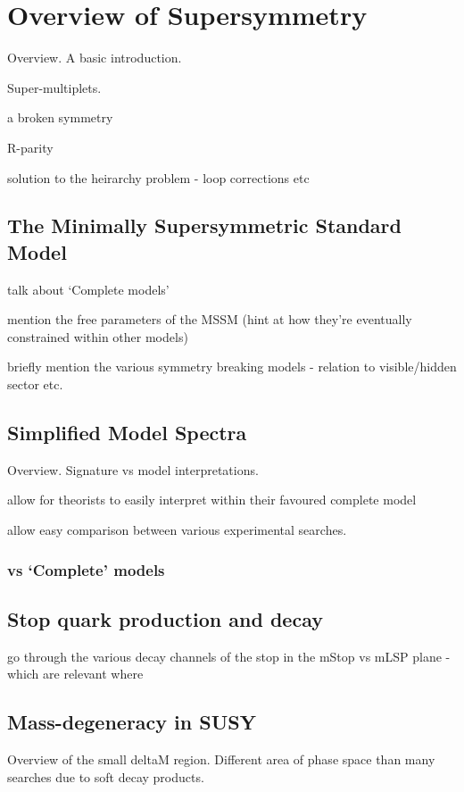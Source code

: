 \section{Overview of Supersymmetry}  %
\label{sec:supersymmetry_overview}
Overview. A basic introduction.

Super-multiplets.

a broken symmetry

R-parity

solution to the heirarchy problem - loop corrections etc

\subsection{The Minimally Supersymmetric Standard Model}
talk about `Complete models'

mention the free parameters of the MSSM (hint at how they're eventually 
constrained within other models)

briefly mention the various symmetry breaking models - relation to visible/hidden sector 
etc.


\subsection{Simplified Model Spectra}
Overview. Signature vs model interpretations.

allow for theorists to easily interpret within their favoured complete model

allow easy comparison between various experimental searches.

\subsubsection{vs `Complete' models}

\subsection{Stop quark production and decay}
go through the various decay channels of the stop in the mStop vs mLSP plane
- which are relevant where

\subsection{Mass-degeneracy in SUSY}
Overview of the small deltaM region. Different area of phase space than many searches due to soft decay 
products.

